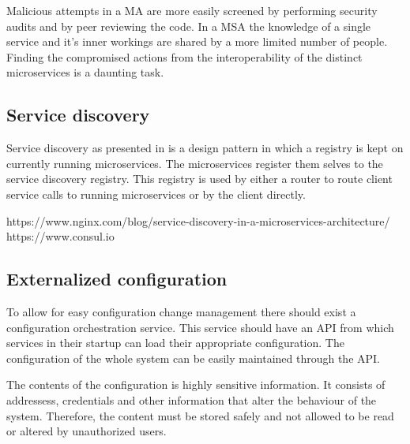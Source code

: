 \begin{sloppypar}
    Malicious attempts in a MA are more easily screened by performing security
    audits and by peer reviewing the code. In a MSA the knowledge of a single 
    service and it's inner workings are shared by a more limited number of people.
    Finding the compromised actions from the interoperability of the distinct 
    microservices is a daunting task.
\end{sloppypar}
\begin{sloppypar}
    
\end{sloppypar}

\subsection{Service discovery}
\begin{sloppypar}
    Service discovery as presented in \citet{DBLP:journals/corr/MontesiW16} is a 
    design pattern in which a registry is kept on currently running microservices. 
    The microservices register them selves to the service discovery registry. 
    This registry is used by either a router to route client service calls to 
    running microservices or by the client directly.
\end{sloppypar}
\begin{sloppypar}
\end{sloppypar}
\begin{sloppypar}
    https://www.nginx.com/blog/service-discovery-in-a-microservices-architecture/
    https://www.consul.io
\end{sloppypar}


\subsection{Externalized configuration}
\begin{sloppypar}
    To allow for easy configuration change management there should exist a 
    configuration orchestration service. This service should have an API from 
    which services in their startup can load their appropriate configuration. 
    The configuration of the whole system can be easily maintained through the 
    API.
\end{sloppypar}
\begin{sloppypar}
    The contents of the configuration is highly sensitive information. It 
    consists of addressess, credentials and other information that alter 
    the behaviour of the system. Therefore, the content must be stored safely 
    and not allowed to be read or altered by unauthorized users.
\end{sloppypar}




